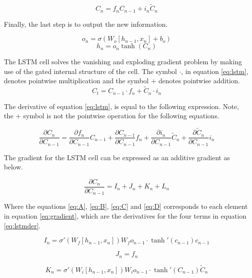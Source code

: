 \documentclass[../main.tex]{subfiles}
\begin{document}
$$C_n = f_n C_{n-1} + i_n \tilde{C}_n$$

Finally, the last step is to output the new information.

$$o_n = \sigma \left( W_o \left[ h_{n-1}, x_n \right] + b_o \right)$$
$$h_n = o_n \tanh\left(C_n\right)$$

The LSTM cell solves the vanishing and exploding gradient problem by making use of the gated internal structure of the cell. The symbol $\cdot$, in equation \ref{eq:lstm}, denotes pointwise multiplication and the symbol $+$ denotes pointwise addition.
\begin{equation} \label{eq:lstm}
C_t = C_{n-1} \cdot f_n + \tilde{C}_n \cdot i_n
\end{equation}

The derivative of equation \ref{eq:lstm}, is equal to the following expression. Note, the $+$ symbol is not the pointwise operation for the following equations.

\begin{equation} \label{eq:lstmder}
\frac{\partial C_n}{\partial C_{n-1}} = \frac{\partial f_n}{\partial C_{n-1}} C_{n-1} + \frac{\partial C_{n-1}}{\partial C_{n-1}} f_n + \frac{\partial i_n}{\partial C_{n-1}} \tilde{C}_n + \frac{\partial \tilde{C}_n}{\partial C_{n-1}} i_n
\end{equation}

The gradient for the LSTM cell can be expressed as an additive gradient as below.

\begin{equation} \label{eq:gradient}
\frac{\partial C_n}{\partial C_{n-1}} = I_n + J_n + K_n + L_n
\end{equation}

Where the equations \ref{eq:A}, \ref{eq:B}, \ref{eq:C} and \ref{eq:D} corresponds to each element in equation \ref{eq:gradient}, which are the derivatives for the four terms in equation \ref{eq:lstmder}.

\begin{equation} \label{eq:A}
I_n = \sigma'\left( W_f \left[ h_{n-1}, x_n \right]\right) W_f o_{n-1} \cdot \tanh'\left( c_{n-1}\right) c_{n-1}
\end{equation}

\begin{equation}\label{eq:B}
J_n = f_n
\end{equation}

\begin{equation} \label{eq:C}
K_n = \sigma'\left( W_i \left[ h_{n-1}, x_n \right]\right) W_i o_{n-1} \cdot \tanh'\left( C_{n-1}\right)\tilde{C}_n
\end{equation}
\end{document}
